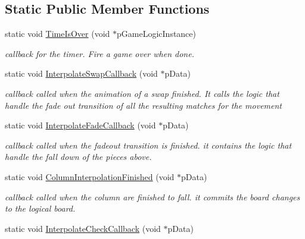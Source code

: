 \subsection*{Static Public Member Functions}
\begin{DoxyCompactItemize}
\item 
\hypertarget{class_game_logic_ae8535585155f4488c4ce58cdb4d77055}{static void \hyperlink{class_game_logic_ae8535585155f4488c4ce58cdb4d77055}{Time\-Is\-Over} (void $\ast$p\-Game\-Logic\-Instance)}\label{class_game_logic_ae8535585155f4488c4ce58cdb4d77055}

\begin{DoxyCompactList}\small\item\em callback for the timer. Fire a game over when done. \end{DoxyCompactList}\item 
\hypertarget{class_game_logic_a67fff8c0f9cf826eb6c7c70c3e804593}{static void \hyperlink{class_game_logic_a67fff8c0f9cf826eb6c7c70c3e804593}{Interpolate\-Swap\-Callback} (void $\ast$p\-Data)}\label{class_game_logic_a67fff8c0f9cf826eb6c7c70c3e804593}

\begin{DoxyCompactList}\small\item\em callback called when the animation of a swap finished. It calls the logic that handle the fade out transition of all the resulting matches for the movement \end{DoxyCompactList}\item 
\hypertarget{class_game_logic_a9643f952b7f862da7a5b42e47350c721}{static void \hyperlink{class_game_logic_a9643f952b7f862da7a5b42e47350c721}{Interpolate\-Fade\-Callback} (void $\ast$p\-Data)}\label{class_game_logic_a9643f952b7f862da7a5b42e47350c721}

\begin{DoxyCompactList}\small\item\em callback called when the fadeout transition is finished. it contains the logic that handle the fall down of the pieces above. \end{DoxyCompactList}\item 
\hypertarget{class_game_logic_a0dc9058dbcf18db3a155d03b08291003}{static void \hyperlink{class_game_logic_a0dc9058dbcf18db3a155d03b08291003}{Column\-Interpolation\-Finished} (void $\ast$p\-Data)}\label{class_game_logic_a0dc9058dbcf18db3a155d03b08291003}

\begin{DoxyCompactList}\small\item\em callback called when the column are finished to fall. it commits the board changes to the logical board. \end{DoxyCompactList}\item 
\hypertarget{class_game_logic_ad8d6680d714c1c1072a6ae39a7d2d442}{static void \hyperlink{class_game_logic_ad8d6680d714c1c1072a6ae39a7d2d442}{Interpolate\-Check\-Callback} (void $\ast$p\-Data)}\label{class_game_logic_ad8d6680d714c1c1072a6ae39a7d2d442}


\end{DoxyCompactItemize}
